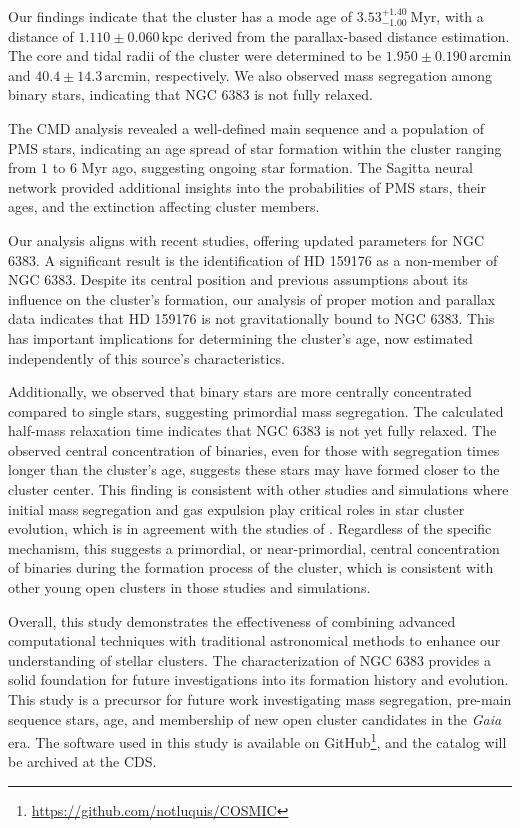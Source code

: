\documentclass{aa}
\begin{document}
Our findings indicate that the cluster has a mode age of $3.53^{+1.40}_{-1.00}~\mathrm{Myr}$, with a distance of $1.110 \pm 0.060\,\mathrm{kpc}$ derived from the parallax-based distance estimation. The core and tidal radii of the cluster were determined to be $1.950 \pm 0.190\,\mathrm{arcmin}$ and $40.4 \pm 14.3\,\mathrm{arcmin}$, respectively. We also observed mass segregation among binary stars, indicating that NGC 6383 is not fully relaxed.

The CMD analysis revealed a well-defined main sequence and a population of PMS stars, indicating an age spread of star formation within the cluster ranging from $1$ to $6$ Myr ago, suggesting ongoing star formation. The Sagitta neural network provided additional insights into the probabilities of PMS stars, their ages, and the extinction affecting cluster members.

Our analysis aligns with recent studies, offering updated parameters for NGC 6383. A significant result is the identification of HD 159176 as a non-member of NGC 6383. Despite its central position and previous assumptions about its influence on the cluster's formation, our analysis of proper motion and parallax data indicates that HD 159176 is not gravitationally bound to NGC 6383. This has important implications for determining the cluster's age, now estimated independently of this source's characteristics.

Additionally, we observed that binary stars are more centrally concentrated compared to single stars, suggesting primordial mass segregation. The calculated half-mass relaxation time indicates that NGC 6383 is not yet fully relaxed. The observed central concentration of binaries, even for those with segregation times longer than the cluster's age, suggests these stars may have formed closer to the cluster center. This finding is consistent with other studies and simulations where initial mass segregation and gas expulsion play critical roles in star cluster evolution, which is in agreement with the studies of \citet{2007ApJ...655L..45M,2008MNRAS.386.2047M,2007AJ....134.1368C,2007MNRAS.381L..40D,2008AJ....135..173S}. Regardless of the specific mechanism, this suggests a primordial, or near-primordial, central concentration of binaries during the formation process of the cluster, which is consistent with other young open clusters in those studies and simulations.

Overall, this study demonstrates the effectiveness of combining advanced computational techniques with traditional astronomical methods to enhance our understanding of stellar clusters. The characterization of NGC 6383 provides a solid foundation for future investigations into its formation history and evolution. This study is a precursor for future work investigating mass segregation, pre-main sequence stars, age, and membership of new open cluster candidates in the \textit{Gaia} era. The software used in this study is available on GitHub\footnote{\href{https://github.com/notluquis/COSMIC}{https://github.com/notluquis/COSMIC}}, and the catalog will be archived at the CDS.
\end{document}
